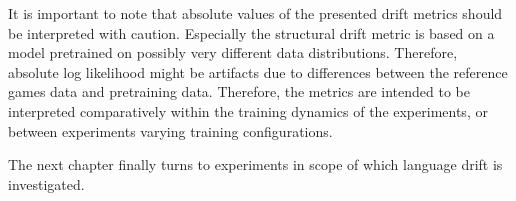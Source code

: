 It is important to note that absolute values of the presented drift metrics should be interpreted with caution. Especially the structural drift metric is based on a model pretrained on possibly very different data distributions. Therefore, absolute log likelihood might be artifacts due to differences between the reference games data and pretraining data. Therefore, the metrics are intended to be interpreted comparatively within the training dynamics of the experiments, or between experiments varying training configurations.

The next chapter finally turns to experiments in scope of which language drift is investigated. 